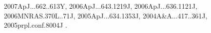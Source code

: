 \documentclass[12pt]{article}
\begin{document}
\begin{enumerate}
\begin{enumerate}
{2007ApJ...662..613Y,%
2006ApJ...643.1219J,%
2006ApJ...636.1121J,%
2006MNRAS.370L..71J,%
2005ApJ...634.1353J,%
2004A&A...417..361J,%
2005prpl.conf.8004J%
}.


\end{enumerate}
\end{enumerate}
\end{document}
